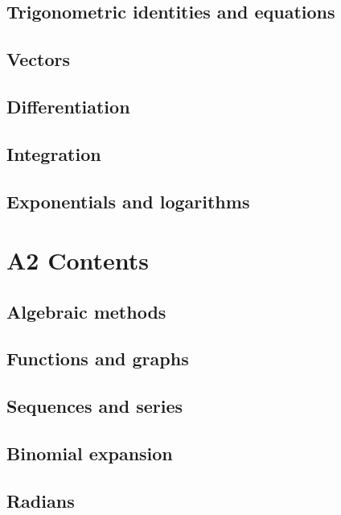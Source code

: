 \documentclass[oneside,fleqn,11pt]{book}
\begin{document}
\chapter{Trigonometric identities and equations}


\chapter{Vectors}


\chapter{Differentiation}


\chapter{Integration}


\chapter{Exponentials and logarithms}


\part{A2 Contents}
\chapter{Algebraic methods}


\chapter{Functions and graphs}


\chapter{Sequences and series}


\chapter{Binomial expansion}


\chapter{Radians}

\end{document}
